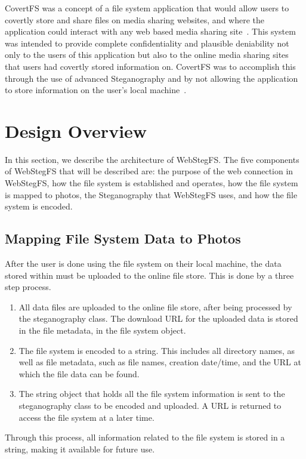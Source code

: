 \documentclass[12pt,journal,compsoc]{IEEEtran}
\begin{document}
CovertFS was a concept of a file system application that would allow users to covertly store and share files on media sharing websites, and where the application could interact with any web based media sharing site~\cite{Baliga2007}. This system was intended to provide complete confidentiality and plausible deniability not only to the users of this application but also to the online media sharing sites that users had covertly stored information on. CovertFS was to accomplish this through the use of advanced Steganography and by not allowing the application to store information on the user's local machine~\cite{Baliga2007}.


\section{Design Overview}

In this section, we describe  the architecture of WebStegFS. The five components of WebStegFS that will be described are: the purpose of the web connection in WebStegFS, how the file system is established and operates, how the file system is mapped to photos, the Steganography that WebStegFS uses, and how the file system is encoded.





\subsection{Mapping File System Data to Photos}

After the user is done using the file system on their local machine, the data stored within must be uploaded to the online file store. This is done by a three step process.
\begin{enumerate}
\item All data files are uploaded to the online file store, after being processed by the steganography class. The download URL for the uploaded data is stored in the file metadata, in the file system object.
\item The file system is encoded to a string. This includes all directory names, as well as file metadata, such as file names, creation date/time, and the URL at which the file data can be found.
\item The string object that holds all the file system information is sent to the steganography class to be encoded and uploaded. A URL is returned to access the file system at a later time.
\end{enumerate}
Through this process, all information related to the file system is stored in a string, making it available for future use.
\end{document}
